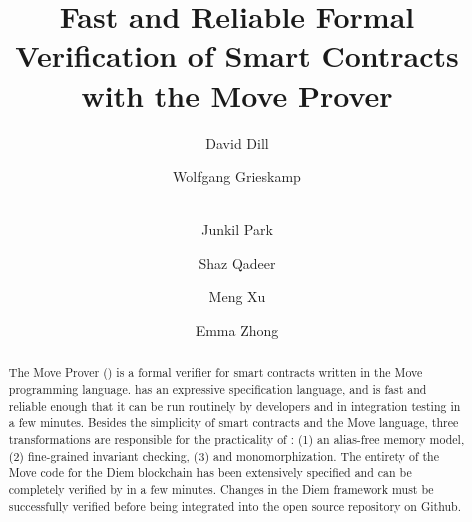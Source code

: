 \documentclass[runningheads]{llncs}
\begin{document}
\title{Fast and Reliable Formal Verification of Smart Contracts with the Move Prover}



\author{
  David Dill \and Wolfgang Grieskamp \and \\ Junkil
  Park \and Shaz Qadeer \and Meng Xu
  \and Emma Zhong
}


\maketitle
\begin{abstract}
  The Move Prover (\MVP) is a formal verifier for smart contracts
  written in the Move programming language. \MVP has an expressive
  specification language, and is fast and reliable enough that it can
  be run routinely by developers and in integration testing in a few
  minutes. Besides the simplicity of smart contracts and the Move
  language, three transformations are responsible for the practicality
  of \MVP: (1) an alias-free memory model, (2) fine-grained invariant
  checking, (3) and monomorphization.  The entirety of the Move code for
  the Diem blockchain has been extensively specified and can be
  completely verified by \MVP in a few minutes. Changes in the Diem
  framework must be successfully verified before being integrated into
  the open source repository on Github.
\end{abstract}











\appendix

\newpage
{}

\newpage

\end{document}
